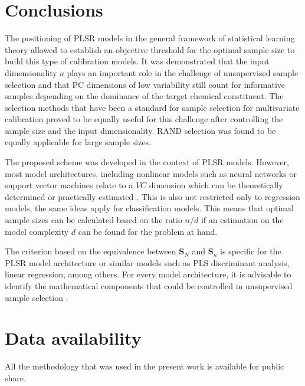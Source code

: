 \documentclass[journal=ancham,manuscript=article]{achemso}
\begin{document}
\section*{Conclusions}\label{conclusions}

The positioning of PLSR models in the general framework of statistical learning theory allowed to establish an objective threshold for the optimal sample size to build this type of calibration models. It was demonstrated that the input dimensionality $a$ plays an important role in the challenge of unsupervised sample selection and that PC dimensions of low variability still count for informative samples depending on the dominance of the target chemical constituent. The selection methods that have been a standard for sample selection for multivariate calibration proved to be equally useful for this challenge after controlling the sample size and the input dimensionality. RAND selection was found to be equally applicable for large sample sizes. 

The proposed scheme was developed in the context of PLSR models. However, most model architectures, including nonlinear models such as neural networks or support vector machines relate to a $VC$ dimension which can be theoretically determined or practically estimated \cite{Vapnik2019, Vapnik1994}. This is also not restricted only to regression models, the same ideas apply for classification models. This means that optimal sample sizes can be calculated based on the ratio $n/d$ if an estimation on the model complexity $d$ can be found for the problem at hand. 

The criterion based on the equivalence between $\mathbf{S}_N$ and $\mathbf{S}_n$ is specific for the PLSR model architecture or similar models such as PLS discriminant analysis, linear regression, among others. For every model architecture, it is advisable to identify the mathematical components that could be controlled in unsupervised sample selection \cite{Li2020}. 





\section{Data availability}

All the methodology that was used in the present work is available for public share. 
\end{document}
